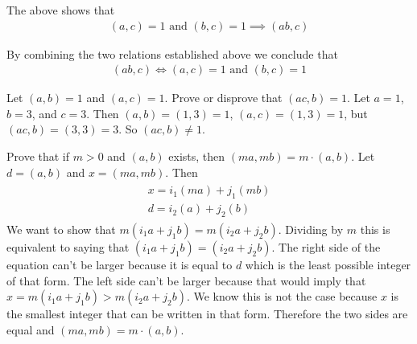 \documentclass[paper=a4, fontsize=11pt]{jhwhw} %
\begin{document}
The above shows that 
\begin{align}
\left(a, c\right) = 1\text{ and }\left(b, c\right) = 1 \implies \left(ab, c\right)
\end{align}

By combining the two relations established above we conclude that 
\begin{align}
\left(ab, c\right) \iff \left(a, c\right) = 1\text{ and }\left(b, c\right) = 1
\end{align}

Let $\left(a, b\right) = 1$ and $\left(a, c\right) = 1$. Prove or disprove that $\left(ac, b\right) = 1$.
\solution
Let $a=1$, $b=3$, and $c=3$. Then $(a, b) = (1, 3) = 1$, $(a, c) = (1, 3) = 1$, but $(ac, b) = (3, 3) = 3$. So $(ac, b)\not= 1$.


Prove that if $m > 0$ and $\left(a, b\right)$ exists, then $\left(ma, mb\right) = m \cdot \left(a, b\right)$.
\solution
Let $d=\left(a, b\right)$ and $x=\left(ma,mb\right)$. Then 
\begin{align}
\begin{split}
x = i_1\left(ma\right) + j_1\left(mb\right)\\
d = i_2\left(a\right) + j_2\left(b\right)
\end{split}
\end{align}
We want to show that $m\left(i_1a + j_1b\right) = m\left(i_2a + j_2b\right)$. Dividing by $m$ this is equivalent to saying that $\left(i_1a+j_1b\right) = \left(i_2a + j_2b\right)$. The right side of the equation can't be larger because it is equal to $d$ which is the least possible integer of that form. The left side can't be larger because that would imply that $x = m\left(i_1a+j_1b\right) > m\left(i_2a + j_2b\right)$. We know this is not the case because $x$ is the smallest integer that can be written in that form. Therefore the two sides are equal and $\left(ma, mb\right) = m\cdot \left(a, b\right)$.
\end{document}
